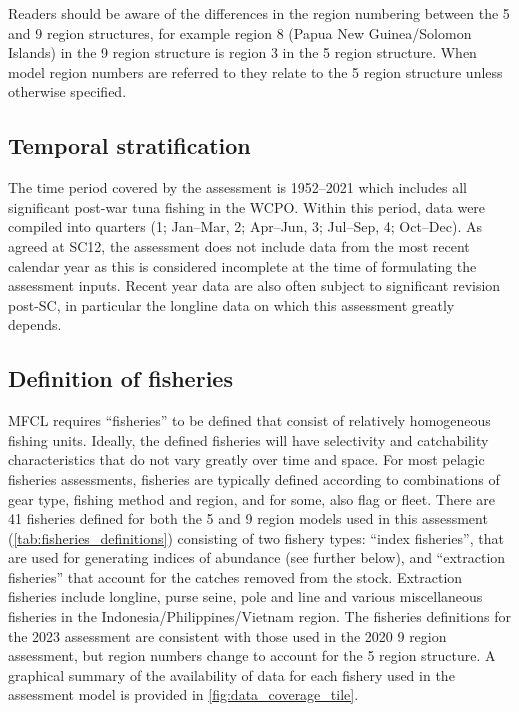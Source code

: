 Readers should be aware of the differences in the region numbering between the 5 and 9 region structures, for example region 8 (Papua New Guinea/Solomon Islands) in the 9 region structure is region 3 in the 5 region structure. When model region numbers are referred to they relate to the 5 region structure unless otherwise specified.

\subsection{Temporal stratification}
\label{sec:temporal_stratification}

The time period covered by the assessment is 1952--2021 which includes all significant post-war tuna fishing in the WCPO. Within this period, data were compiled into quarters (1; Jan--Mar, 2; Apr--Jun, 3; Jul--Sep, 4; Oct--Dec). As agreed at SC12, the assessment does not include data from the most recent calendar year as this is considered incomplete at the time of formulating the assessment inputs. Recent year data are also often subject to significant revision post-SC, in particular the longline data on which this assessment greatly depends.

\subsection{Definition of fisheries}
\label{sec:fisheries_definitions}

MFCL requires \enquote{fisheries} to be defined that consist of relatively homogeneous fishing units. Ideally, the defined fisheries will have selectivity and catchability characteristics that do not vary greatly over time and space. For most pelagic fisheries assessments, fisheries are typically defined according to combinations of gear type, fishing method and region, and for some, also flag or fleet. There are 41 fisheries defined for both the 5 and 9 region models used in this assessment (\autoref{tab:fisheries_definitions}) consisting of two fishery types: ``index fisheries'', that are used for generating indices of abundance (see further below), and ``extraction fisheries'' that account for the catches removed from the stock. Extraction fisheries include longline, purse seine, pole and line and various miscellaneous fisheries in the Indonesia/Philippines/Vietnam region. The fisheries definitions for the 2023 assessment are consistent with those used in the 2020 9 region assessment, but region numbers change to account for the 5 region structure. A graphical summary of the availability of data for each fishery used in the assessment model is provided in \autoref{fig:data_coverage_tile}.

